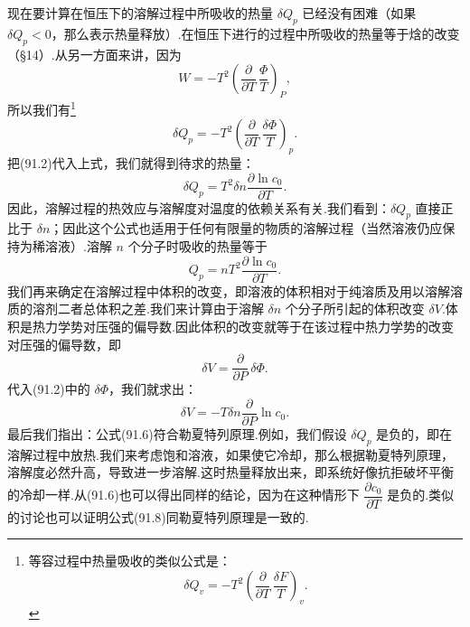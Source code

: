 现在要计算在恒压下的溶解过程中所吸收的热量 $\delta Q_p$ 已经没有困难（如果 $\delta Q_p<0$，那么表示热量释放）.在恒压下进行的过程中所吸收的热量等于焓的改变（§14）.从另一方面来讲，因为
\begin{equation*}
  W=-T^2\left(\frac{\partial}{\partial T}\,\frac{\varPhi}{T}\right)_P,
\end{equation*}
所以我们有\footnote{等容过程中热量吸收的类似公式是：
\begin{equation*}
  \delta Q_v=-T^2\left(\frac{\partial}{\partial T}\,\frac{\delta F}{T}\right)_v.
\tag{91.4a}
\end{equation*}}
\begin{equation}
  \delta Q_p=-T^2\left(\frac{\partial}{\partial T}\,\frac{\delta\varPhi}{T}\right)_p.
\end{equation}
把(91.2)代入上式，我们就得到待求的热量：
\begin{equation}
  \delta Q_p=T^2\delta n\frac{\partial\ln c_0}{\partial T}.
\end{equation}
因此，溶解过程的热效应与溶解度对温度的依赖关系有关.我们看到：$\delta Q_p$ 直接正比于 $\delta n$；因此这个公式也适用于任何有限量的物质的溶解过程（当然溶液仍应保持为稀溶液）.溶解 $n$ 个分子时吸收的热量等于
\begin{equation}
  Q_p=nT^2\frac{\partial\ln c_0}{\partial T}.
\end{equation}
我们再来确定在溶解过程中体积的改变，即溶液的体积相对于纯溶质及用以溶解溶质的溶剂二者总体积之差.我们来计算由于溶解 $\delta n$ 个分子所引起的体积改变 $\delta V$.体积是热力学势对压强的偏导数.因此体积的改变就等于在该过程中热力学势的改变对压强的偏导数，即
\begin{equation}
  \delta V=\frac{\partial}{\partial P}\,\delta\varPhi.
\end{equation}
代入(91.2)中的 $\delta\varPhi$，我们就求出：
\begin{equation}
  \delta V=-T\delta n\frac{\partial}{\partial P}\ln c_0.
\end{equation}
最后我们指出：公式(91.6)符合勒夏特列原理.例如，我们假设 $\delta Q_p$ 是负的，即在溶解过程中放热.我们来考虑饱和溶液，如果使它冷却，那么根据勒夏特列原理，溶解度必然升高，导致进一步溶解.这时热量释放出来，即系统好像抗拒破坏平衡的冷却一样.从(91.6)也可以得出同样的结论，因为在这种情形下 $\dfrac{\partial c_0}{\partial T}$ 是负的.类似的讨论也可以证明公式(91.8)同勒夏特列原理是一致的.

